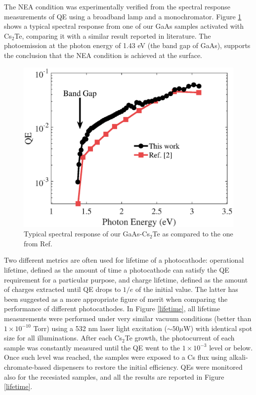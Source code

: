 The NEA condition was experimentally verified from the spectral response measurements of QE using a broadband lamp and a monochromator. Figure \ref{spectral} shows a typical spectral response from one of our GaAs samples activated with Cs$_2$Te, comparing it with a similar result reported in literature.\cite{kuriki2015_GaAsPhotocathodeActivation} The photoemission at the photon energy of 1.43 eV (the band gap of GaAs), supports the conclusion that the NEA condition is achieved at the surface.

\begin{figure}
    \centering
    \includegraphics[scale=0.53]{figs/CsTe/spectral.eps}
    \caption{Typical spectral response of our GaAs-Cs$_2$Te as compared to the one from Ref.\cite{kuriki2015_GaAsPhotocathodeActivation}}
    \label{spectral}
\end{figure}

Two different metrics are often used for lifetime of a photocathode: operational lifetime, defined as the amount of time a photocathode can satisfy the QE requirement for a particular purpose, and charge lifetime, defined as the amount of charges extracted until QE drops to $1/e$ of the initial value.\cite{grames2011_ChargeFluenceLifetime} The latter has been suggested as a more appropriate figure of merit when comparing the performance of different photocathodes. %
In Figure \ref{lifetime}, all lifetime measurements were performed under very similar vacuum conditions (better than $1\times10^{-10}$ Torr) using a 532 nm laser light excitation ($\sim{50} \mu$W) with identical spot size for all illuminations. After each Cs$_2$Te growth, the photocurrent of each sample was constantly measured until the QE went to the $1\times10^{-3}$ level or below. Once such level was reached, the samples were exposed to a Cs flux using alkali-chromate-based dispensers to restore the initial efficiency. QEs were monitored also for the recesiated samples, and all the results are reported in Figure \ref{lifetime}.

